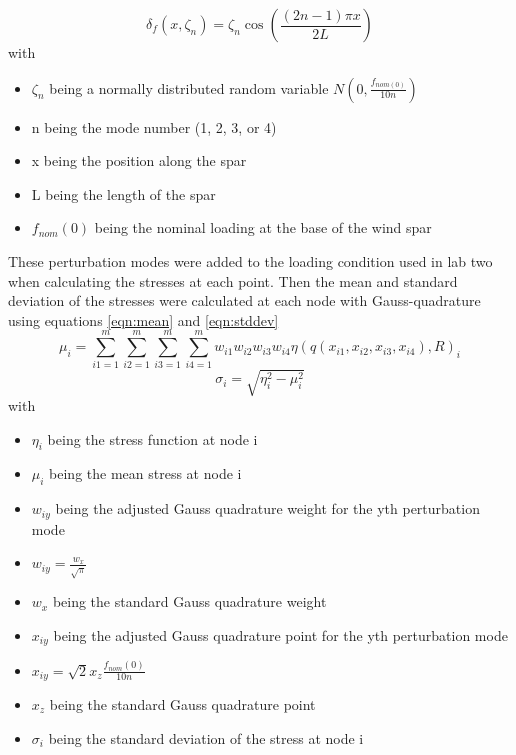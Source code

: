 \documentclass[11pt]{article}%
\begin{document}
\begin{equation}
\label{eqn:loadingModes}
\delta_{f}(x,\zeta_{n})=\zeta_{n}\cos(\frac{(2n-1)\pi x}{2L})
\end{equation}
with
\begin{itemize}
	\item $\zeta_{n}$ being a normally distributed random variable $N(0,\frac{f_{nom(0)}}{10n})$
	\item n being the mode number (1, 2, 3, or 4)
	\item x being the position along the spar
	\item L being the length of the spar
	\item $f_{nom}(0)$ being the nominal loading at the base of the wind spar
\end{itemize}
These perturbation modes were added to the loading condition used in lab two when calculating the stresses at each point. Then the mean and standard deviation of the stresses were calculated at each node with Gauss-quadrature using equations \ref{eqn:mean} and \ref{eqn:stddev}
\begin{equation}
\label{eqn:mean}
\mu_{i}=\sum_{i1=1}^{m}\sum_{i2=1}^{m}\sum_{i3=1}^{m}\sum_{i4=1}^{m} w_{i1}w_{i2}w_{i3}w_{i4} \eta(q(x_{i1},x_{i2},x_{i3},x_{i4}),R)_{i}
\end{equation}
\begin{equation}
\label{eqn:stddev}
\sigma_{i}=\sqrt{\eta^{2}_{i}-\mu^{2}_{i}}
\end{equation}
with
\begin{itemize}
	\item $\eta_{i}$ being the stress function at node i
	\item $\mu_{i}$ being the mean stress at node i
	\item $w_{iy}$ being the adjusted Gauss quadrature weight for the yth perturbation mode 
	\item $w_{iy}= \frac{w_{x}}{\sqrt{\pi}}$
	\item $w_{x}$ being the standard Gauss quadrature weight \cite{gauss}
	\item $x_{iy}$ being the adjusted Gauss quadrature point for the yth perturbation mode
	\item $x_{iy}= \sqrt{2}x_{z}\frac{f_{nom}(0)}{10n}$
	\item $x_{z}$ being the standard Gauss quadrature point \cite{gauss}
	\item $\sigma_{i}$ being the standard deviation of the stress at node i
\end{itemize}
\end{document}
